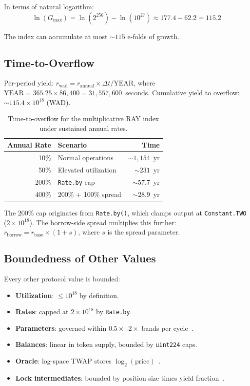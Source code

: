 \documentclass[10pt,a4paper,twocolumn]{article}
\theoremstyle{definition}
\theoremstyle{plain}
\theoremstyle{remark}
\begin{document}
In terms of natural logarithm:
\begin{equation}
\label{eq:efolds}
\ln(G_{\max}) = \ln(2^{256}) - \ln(10^{27}) \approx 177.4 - 62.2 = 115.2
\end{equation}

The index can accumulate at most ${\sim}115$ e-folds of growth.

\subsection{Time-to-Overflow}
\label{subsec:time-to-overflow}

Per-period yield: $r_{\text{wad}} = r_{\text{annual}} \times \Delta t / \text{YEAR}$, where $\text{YEAR} = 365.25 \times 86{,}400 = 31{,}557{,}600$~seconds. Cumulative yield to overflow: ${\sim}115.4 \times 10^{18}$ (WAD).

\begin{table}[htbp]
\centering
\caption{Time-to-overflow for the multiplicative RAY index under sustained annual rates.}
\label{tab:overflow}
\small
\begin{tabular*}{0.95\columnwidth}{@{\extracolsep{\fill}}rlr@{}}
\toprule
Annual Rate & Scenario & Time \\
\midrule
10\% & Normal operations & ${\sim}1{,}154$~yr \\
50\% & Elevated utilization & ${\sim}231$~yr \\
200\% & \texttt{Rate.by} cap & ${\sim}57.7$~yr \\
400\% & 200\% + 100\% spread & ${\sim}28.9$~yr \\
\bottomrule
\end{tabular*}
\end{table}

The 200\% cap originates from \texttt{Rate.by()}, which clamps output at \texttt{Constant.TWO} ($2 \times 10^{18}$). The borrow-side spread multiplies this further: $r_{\text{borrow}} = r_{\text{base}} \times (1 + s)$, where $s$ is the spread parameter.

\subsection{Boundedness of Other Values}
\label{subsec:bounded}

Every other protocol value is bounded:

\begin{itemize}[leftmargin=*, nosep]
\item \textbf{Utilization}: $\leq 10^{18}$ by definition.
\item \textbf{Rates}: capped at $2 \times 10^{18}$ by \texttt{Rate.by}.
\item \textbf{Parameters}: governed within $0.5\times$--$2\times$ bands per cycle~\cite{wp}.
\item \textbf{Balances}: linear in token supply, bounded by \texttt{uint224} caps.
\item \textbf{Oracle}: log-space TWAP stores $\log_2(\text{price})$~\cite{wp}.
\item \textbf{Lock intermediates}: bounded by position size times yield fraction~\cite{lck}.
\end{itemize}
\end{document}
